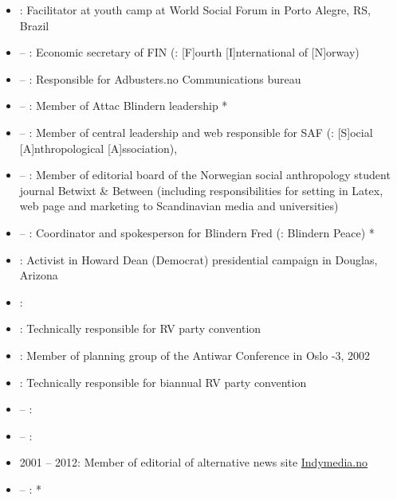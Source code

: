 \begin{itemize}
\item {}: Facilitator at youth camp at World Social Forum in Porto Alegre, RS, Brazil
\item {} – : Economic secretary of FIN (\english: [F]ourth [I]nternational of [N]orway)
\item {} – : Responsible for Adbusters.no Communications bureau
\item {} –  : Member of Attac Blindern leadership *
\item {} – : Member of central leadership and web responsible for SAF (\english: [S]ocial [A]nthropological [A]ssociation), \uio
\item {} – : Member of editorial board of the Norwegian social anthropology student journal Betwixt \& Between
(including responsibilities for setting in Latex, web page and marketing to Scandinavian media and universities)
\item {} –  : Coordinator and spokesperson for Blindern Fred (\english: Blindern Peace) *
\item {}: Activist in Howard Dean (Democrat) presidential campaign in Douglas, Arizona
\item {}: 
\item {}: Technically responsible for RV party convention
\item {}: Member of planning group of the Antiwar Conference in Oslo -3, 2002
\item {}: Technically responsible for biannual RV party convention
\item {} – : 
\item {} – : 
\item 2001 – 2012: Member of editorial of alternative news site \href{Indymedia.no}{Indymedia.no}
\item {} – :  *

\end{itemize}
